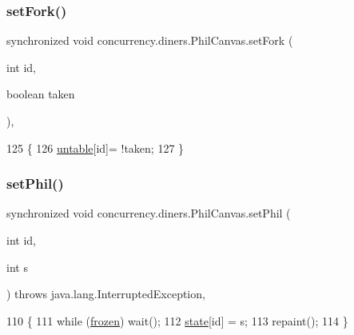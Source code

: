 \subsubsection{\texorpdfstring{set\+Fork()}{setFork()}}
{\footnotesize\ttfamily synchronized void concurrency.\+diners.\+Phil\+Canvas.\+set\+Fork (\begin{DoxyParamCaption}\item[{int}]{id,  }\item[{boolean}]{taken }\end{DoxyParamCaption})\hspace{0.3cm}{\ttfamily [inline]}, {\ttfamily [package]}}


\begin{DoxyCode}
125                                                      \{
126         \mbox{\hyperlink{classconcurrency_1_1diners_1_1_phil_canvas_a52cc075fd7ba820c26006a73690a49c1}{untable}}[id]= !taken;
127     \}
\end{DoxyCode}
\mbox{\label{classconcurrency_1_1diners_1_1_phil_canvas_ab80a0adca1d4df3de8bd715deb3af5fb}} 
\subsubsection{\texorpdfstring{set\+Phil()}{setPhil()}}
{\footnotesize\ttfamily synchronized void concurrency.\+diners.\+Phil\+Canvas.\+set\+Phil (\begin{DoxyParamCaption}\item[{int}]{id,  }\item[{int}]{s }\end{DoxyParamCaption}) throws java.\+lang.\+Interrupted\+Exception\hspace{0.3cm}{\ttfamily [inline]}, {\ttfamily [package]}}


\begin{DoxyCode}
110                                                                                   \{
111         \textcolor{keywordflow}{while} (\mbox{\hyperlink{classconcurrency_1_1diners_1_1_phil_canvas_a0579ad1dffdd10626026d52e95d0d86a}{frozen}}) wait();
112         \mbox{\hyperlink{classconcurrency_1_1diners_1_1_phil_canvas_afe8fe2130ea9e415bdf1887ec73596c0}{state}}[id] = s;
113         repaint();
114     \}
\end{DoxyCode}
\mbox{\label{classconcurrency_1_1diners_1_1_phil_canvas_aa9331adb1fde2018cb5bce063873f910}} 
